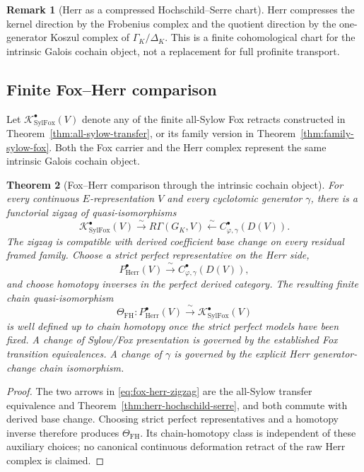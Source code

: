 \documentclass[11pt]{article}
\newtheorem{theorem}{Theorem}[section]
\theoremstyle{definition}
\newtheorem{remark}[theorem]{Remark}
\begin{document}
\begin{remark}[Herr as a compressed Hochschild--Serre chart]\label{rem:herr-wall-compression}
Herr compresses the kernel direction by the Frobenius complex and the quotient direction by the one-generator Koszul complex of $\Gamma_K/\Delta_K$.  This is a finite cohomological chart for the intrinsic Galois cochain object, not a replacement for full profinite transport.
\end{remark}

\subsection{Finite Fox--Herr comparison}

Let $\mathcal K_{\mathrm{SylFox}}^\bullet(V)$ denote any of the finite all-Sylow Fox retracts constructed in Theorem~\ref{thm:all-sylow-transfer}, or its family version in Theorem~\ref{thm:family-sylow-fox}.  Both the Fox carrier and the Herr complex represent the same intrinsic Galois cochain object.

\begin{theorem}[Fox--Herr comparison through the intrinsic cochain object]\label{thm:fox-herr-zigzag}
For every continuous $E$-representation $V$ and every cyclotomic generator $\gamma$, there is a functorial zigzag of quasi-isomorphisms
\begin{equation}\label{eq:fox-herr-zigzag}
 \mathcal K_{\mathrm{SylFox}}^\bullet(V)
 \xrightarrow{\ \sim\ }
 R\Gamma(G_K,V)
 \xleftarrow{\ \sim\ }
 C_{\varphi,\gamma}^\bullet(D(V)).
\end{equation}
The zigzag is compatible with derived coefficient base change on every residual framed family.  Choose a strict perfect representative on the Herr side,
\[
 P_{\mathrm{Herr}}^\bullet(V)
 \xrightarrow{\ \sim\ }
 C_{\varphi,\gamma}^\bullet(D(V)),
\]
and choose homotopy inverses in the perfect derived category.  The resulting finite chain quasi-isomorphism
\[
 \Theta_{\mathrm{FH}}:
 P_{\mathrm{Herr}}^\bullet(V)
 \xrightarrow{\ \sim\ }
 \mathcal K_{\mathrm{SylFox}}^\bullet(V)
\]
is well defined up to chain homotopy once the strict perfect models have been fixed.  A change of Sylow/Fox presentation is governed by the established Fox transition equivalences.  A change of $\gamma$ is governed by the explicit Herr generator-change chain isomorphism.
\end{theorem}

\begin{proof}
The two arrows in \eqref{eq:fox-herr-zigzag} are the all-Sylow transfer equivalence and Theorem~\ref{thm:herr-hochschild-serre}, and both commute with derived base change.  Choosing strict perfect representatives and a homotopy inverse therefore produces $\Theta_{\mathrm{FH}}$.  Its chain-homotopy class is independent of these auxiliary choices; no canonical continuous deformation retract of the raw Herr complex is claimed.
\end{proof}
\end{document}
